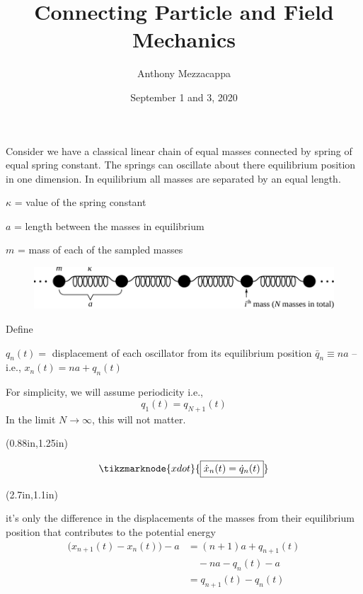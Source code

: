 \documentclass{article}
\title{Connecting Particle and Field Mechanics}
\author{Anthony Mezzacappa}
\date{September 1 and 3, 2020}
\begin{document}
\setlength{\parskip}{1em}
\maketitle

\noindent Consider we have a classical linear chain of equal masses connected by spring of equal spring constant. The springs can oscillate about there equilibrium position in one dimension. In equilibrium all masses are separated by an equal length. \par

$\kappa$ = value of the spring constant \par
$a$ = length between the masses in equilibrium\par
$m$ = mass of each of the sampled masses\par

\begin{figure}[h!]
    \centering
    \includegraphics[width=\textwidth]{pics/04-linear-chain.pdf}
    \label{fig:l4-linear-chain}
\end{figure}

\noindent Define \par
$q_n(t) =$ displacement of each oscillator from its equilibrium position $\bar{q}_n \equiv na $ -- i.e., $x_n(t) = na+q_n(t)$

\noindent For simplicity, we will assume periodicity i.e.,
\begin{equation*}
    q_1(t) =q_{N+1}(t)
\end{equation*}
In the limit $N \rightarrow \infty$, this will not matter.


{%
\begin{textblock*}{2in}(0.88in,1.25in)%
\begin{minipage}[h!]{2in}
    \begin{equation*}
        \tikzmarknode{xdot}{\boxed{\dot{x}_n (t) = \dot{q}_n (t)}}
    \end{equation*}
\end{minipage}%
\end{textblock*}%
}

{%
\begin{textblock*}{3in}(2.7in,1.1in)%
\begin{minipage}[h!]{3in}
    \noindent it's only the difference in the displacements of the masses from their equilibrium position that \linebreak contributes to the potential energy
    \begin{align*}
        \big( x_{n+1} (t) - x_n (t) \big) - a &= ( n + 1 ) a + q_{n+1} (t) \\
        &\quad - n a - q_n (t) - a \\
        &= q_{n+1} (t) - q_n (t)
    \end{align*}
\end{minipage}%
\end{textblock*}%
}
\end{document}
